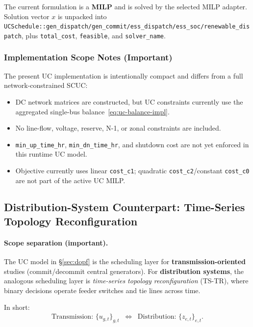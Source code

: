 The current formulation is a \textbf{MILP} and is solved by the selected MILP
adapter.  Solution vector \(x\) is unpacked into
\texttt{UCSchedule::gen\_dispatch/gen\_commit/ess\_dispatch/ess\_soc/renewable\_dispatch},
plus \texttt{total\_cost}, \texttt{feasible}, and \texttt{solver\_name}.

\subsubsection{Implementation Scope Notes (Important)}

The present UC implementation is intentionally compact and differs from a
full network-constrained SCUC:
\begin{itemize}
\item DC network matrices are constructed, but UC constraints currently use
      the aggregated single-bus balance~\eqref{eq:uc-balance-impl}.
\item No line-flow, voltage, reserve, N-1, or zonal constraints are included.
\item \texttt{min\_up\_time\_hr}, \texttt{min\_dn\_time\_hr}, and shutdown cost are
      not yet enforced in this runtime UC model.
\item Objective currently uses linear \texttt{cost\_c1}; quadratic
      \texttt{cost\_c2}/constant \texttt{cost\_c0} are not part of the active UC MILP.
\end{itemize}

\subsection{Distribution-System Counterpart: Time-Series Topology Reconfiguration}
\label{sec:ts-dnr}

\paragraph{Scope separation (important).}
The UC model in \S\ref{sec:dopf} is the scheduling layer for
\textbf{transmission-oriented} studies (commit/decommit central generators).
For \textbf{distribution systems}, the analogous scheduling layer is
\emph{time-series topology reconfiguration} (TS-TR), where binary decisions
operate feeder switches and tie lines across time.

In short:
\begin{align}
\text{Transmission: } \{u_{g,t}\}_{g,t} \;\;\Longleftrightarrow\;\;
\text{Distribution: } \{z_{e,t}\}_{e,t}.
\end{align}

